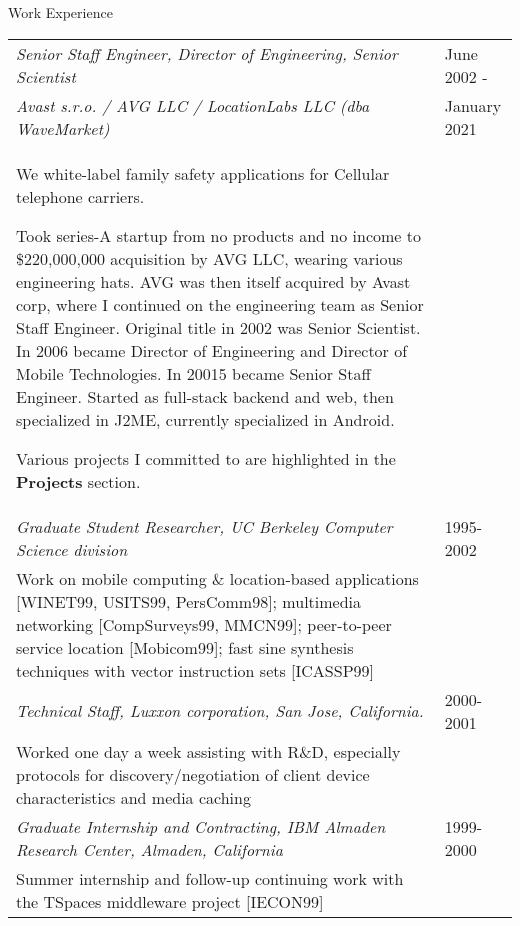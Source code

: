 
\begin{bf} \large
Work Experience
\end{bf}
\medskip

\begin{tabular}{p{5.2in}@{\hspace{1.5cm}}l}

	\em Senior Staff Engineer, Director of Engineering, Senior Scientist 	    & June 2002 -  \\
	 \em  Avast s.r.o. / AVG LLC / LocationLabs LLC (dba WaveMarket)  	& January 2021 \\
	
	   We white-label family safety applications for Cellular telephone carriers.	

	   Took series-A startup from no products and no income to \$220,000,000
	   acquisition by AVG LLC, wearing various engineering hats.  
	   AVG was then itself acquired by Avast corp, 
	   where I continued on the engineering team as Senior Staff Engineer.
	   Original title in 2002 was Senior Scientist.  In 2006 became Director of Engineering and Director of
	   Mobile Technologies. In 20015 became Senior Staff Engineer.
	   Started as full-stack backend and web, then specialized in J2ME, currently specialized in Android.

	   Various projects I committed to are highlighted in the \textbf{Projects} section. \\[9pt] 	  
	  
    \em Graduate Student Researcher, UC Berkeley Computer Science division
                                                                 & 1995-2002 \\
       Work on mobile computing \& location-based applications 
       [WINET99, USITS99, PersComm98]; 
       multimedia networking [CompSurveys99, MMCN99];
       peer-to-peer service location [Mobicom99];
       fast sine synthesis techniques with vector instruction 
       sets [ICASSP99] \\[9pt]

    \em Technical Staff, Luxxon corporation, San Jose, California. & 2000-2001 \\
       Worked one day a week assisting with R\&D, especially
       protocols for discovery/negotiation of client
       device characteristics and media caching \\[9pt]

    \em Graduate Internship and Contracting, IBM Almaden Research Center, 
          Almaden, California
                                                              & 1999-2000 \\
       Summer internship and follow-up continuing work with
       the TSpaces middleware project [IECON99] \\[9pt]


\end{tabular}
